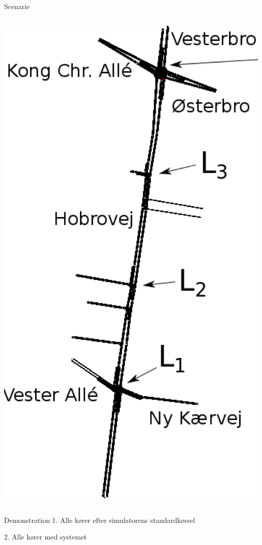 \begin{frame}{Scenarie}
\begin{columns}
\begin{column}{0.4\textwidth}
\includegraphics[width=1\textwidth]{images/Hobrovej.png}
\end{column}
\end{columns}
\end{frame}

\begin{frame}{Demonstration}
1. Alle kører efter simulatorens standardkørsel
\vspace{4mm}

2. Alle kører med systemet
\end{frame}